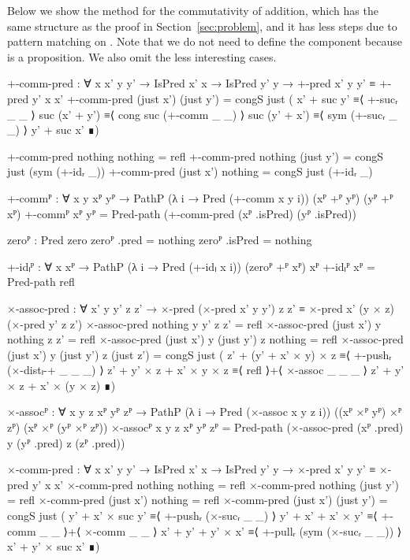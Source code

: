 Below we show the method for the commutativity of addition, which has the same
structure as the proof in Section~\ref{sec:problem}, and it has less steps due
to pattern matching on . Note that we do not need to define
the  component because  is a proposition.
We also omit the less interesting cases.
\begin{code}
  +-comm-pred :
    ∀ {x x' y y'} → IsPred x' x → IsPred y' y →
    +-pred x' y y' ≡ +-pred y' x x'
  +-comm-pred (just x') (just y') =
    congS just
      (  x' + suc y'    ≡⟨ +-sucᵣ _ _ ⟩
         suc (x' + y')  ≡⟨ cong suc (+-comm _ _) ⟩
         suc (y' + x')  ≡⟨ sym (+-sucᵣ _ _) ⟩
         y' + suc x'    ∎)
\end{code}
\begin{code}[hide]
  +-comm-pred nothing nothing = refl
  +-comm-pred nothing (just y') =
    congS just (sym (+-idᵣ _))
  +-comm-pred (just x') nothing =
    congS just (+-idᵣ _)

  +-commᴾ :
    ∀ {x y} xᴾ yᴾ → PathP (λ i → Pred (+-comm x y i)) (xᴾ +ᴾ yᴾ) (yᴾ +ᴾ xᴾ)
  +-commᴾ xᴾ yᴾ = Pred-path (+-comm-pred (xᴾ .isPred) (yᴾ .isPred))

  zeroᴾ : Pred zero
  zeroᴾ .pred = nothing
  zeroᴾ .isPred = nothing

  +-idₗᴾ : ∀ {x} xᴾ → PathP (λ i → Pred (+-idₗ x i)) (zeroᴾ +ᴾ xᴾ) xᴾ
  +-idₗᴾ xᴾ = Pred-path refl

  ×-assoc-pred :
    ∀ x' y y' z z' →
    ×-pred (×-pred x' y y') z z' ≡ ×-pred x' (y × z) (×-pred y' z z')
  ×-assoc-pred nothing y y' z z' = refl
  ×-assoc-pred (just x') y nothing z z' = refl
  ×-assoc-pred (just x') y (just y') z nothing = refl
  ×-assoc-pred (just x') y (just y') z (just z') =
    congS just
      ( z' + (y' + x' × y) × z     ≡⟨ +-pushᵣ (×-distₗ-+ _ _ _) ⟩
        z' + y' × z + x' × y × z   ≡⟨ refl ⟩+⟨ ×-assoc _ _ _ ⟩
        z' + y' × z + x' × (y × z) ∎)

  ×-assocᴾ : ∀ {x y z} xᴾ yᴾ zᴾ →
    PathP (λ i → Pred (×-assoc x y z i)) ((xᴾ ×ᴾ yᴾ) ×ᴾ zᴾ) (xᴾ ×ᴾ (yᴾ ×ᴾ zᴾ))
  ×-assocᴾ {x} {y} {z} xᴾ yᴾ zᴾ =
    Pred-path (×-assoc-pred (xᴾ .pred) y (yᴾ .pred) z (zᴾ .pred))

  ×-comm-pred :
    ∀ {x x' y y'} → IsPred x' x → IsPred y' y →
    ×-pred x' y y' ≡ ×-pred y' x x'
  ×-comm-pred nothing nothing = refl
  ×-comm-pred nothing (just y') = refl
  ×-comm-pred (just x') nothing = refl
  ×-comm-pred (just x') (just y') =
    congS just
      ( y' + x' × suc y'  ≡⟨ +-pushᵣ (×-sucᵣ _ _) ⟩
        y' + x' + x' × y' ≡⟨ +-comm _ _ ⟩+⟨ ×-comm _ _ ⟩
        x' + y' + y' × x' ≡⟨ +-pullᵣ (sym (×-sucᵣ _ _)) ⟩
        x' + y' × suc x' ∎)


\end{code}
